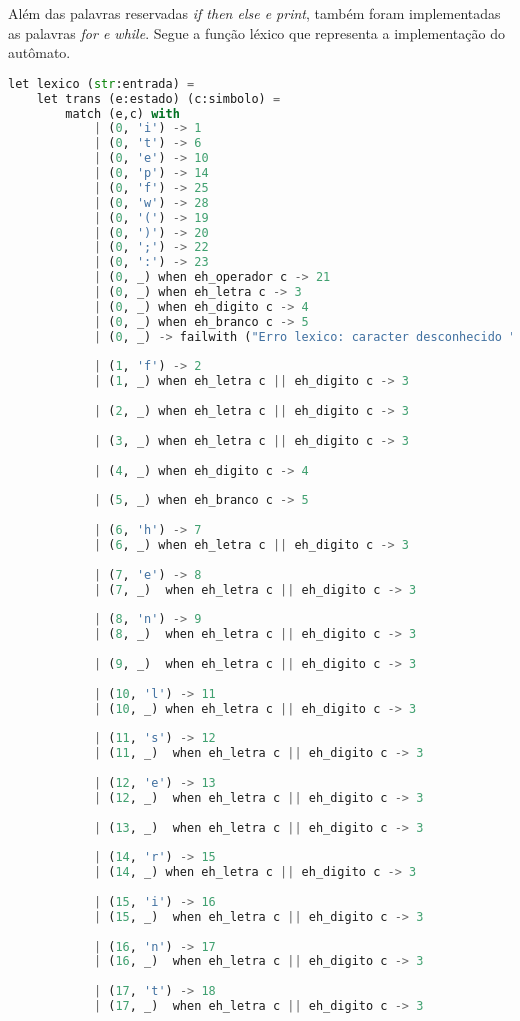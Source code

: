 \documentclass[hidelinks,12pt]{article}
\begin{document}
	Além das palavras reservadas \textit{if then else e print}, também foram implementadas as palavras \textit{for e while}. Segue a função léxico que representa a implementação do autômato.
	
	
	
	\begin{lstlisting}[caption=Código em python,language=python]
	let lexico (str:entrada) = 
	let trans (e:estado) (c:simbolo) = 
		match (e,c) with    
			| (0, 'i') -> 1
			| (0, 't') -> 6
			| (0, 'e') -> 10
			| (0, 'p') -> 14
			| (0, 'f') -> 25
			| (0, 'w') -> 28
			| (0, '(') -> 19
			| (0, ')') -> 20
			| (0, ';') -> 22
			| (0, ':') -> 23
			| (0, _) when eh_operador c -> 21
			| (0, _) when eh_letra c -> 3
			| (0, _) when eh_digito c -> 4
			| (0, _) when eh_branco c -> 5 
			| (0, _) -> failwith ("Erro lexico: caracter desconhecido " ^ Char.escaped c)
			
			| (1, 'f') -> 2
			| (1, _) when eh_letra c || eh_digito c -> 3
			
			| (2, _) when eh_letra c || eh_digito c -> 3
			
			| (3, _) when eh_letra c || eh_digito c -> 3
			
			| (4, _) when eh_digito c -> 4
			
			| (5, _) when eh_branco c -> 5
			
			| (6, 'h') -> 7
			| (6, _) when eh_letra c || eh_digito c -> 3
			
			| (7, 'e') -> 8
			| (7, _)  when eh_letra c || eh_digito c -> 3
			
			| (8, 'n') -> 9  
			| (8, _)  when eh_letra c || eh_digito c -> 3
			
			| (9, _)  when eh_letra c || eh_digito c -> 3
			
			| (10, 'l') -> 11
			| (10, _) when eh_letra c || eh_digito c -> 3
			
			| (11, 's') -> 12
			| (11, _)  when eh_letra c || eh_digito c -> 3
			
			| (12, 'e') -> 13 
			| (12, _)  when eh_letra c || eh_digito c -> 3
			
			| (13, _)  when eh_letra c || eh_digito c -> 3
			
			| (14, 'r') -> 15
			| (14, _) when eh_letra c || eh_digito c -> 3
			
			| (15, 'i') -> 16
			| (15, _)  when eh_letra c || eh_digito c -> 3
			
			| (16, 'n') -> 17 
			| (16, _)  when eh_letra c || eh_digito c -> 3
			
			| (17, 't') -> 18
			| (17, _)  when eh_letra c || eh_digito c -> 3
			

\end{lstlisting}
\end{document}

